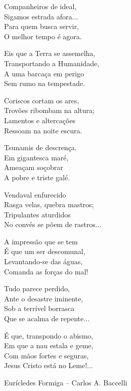 \begin{center}
    


Companheiros de ideal,\\
Sigamos estrada afora...\\
Para quem busca servir,\\
O melhor tempo é agora.


Eis que a Terra se assemelha,\\
Transportando a Humanidade,\\
A uma barcaça em perigo\\
Sem rumo na tempestade.


Coriscos cortam os ares,\\
Trovões ribombam na altura;\\
Lamentos e altercações\\
Ressoam na noite escura.


Tsunamis de descrença.\\
Em gigantesca maré,\\
Ameaçam soçobrar\\
A pobre e triste galé.


Vendaval enfurecido\\
Rasga velas, quebra mastros;\\
Tripulantes aturdidos\\
No convés se põem de rastros...


A impressão que se tem\\
É que um ser descomunal,\\
Levantando-se das águas,\\
Comanda as forças do mal!


Tudo parece perdido,\\
Ante o desastre iminente,\\
Sob a terrível borrasca\\
Que se acalma de repente...


É que, transpondo o abismo,\\
Em que a nau estala e geme,\\
Com mãos fortes e seguras,\\
Jesus Cristo está no Leme!...

\end{center}
Eurícledes Formiga – Carlos A. Baccelli

